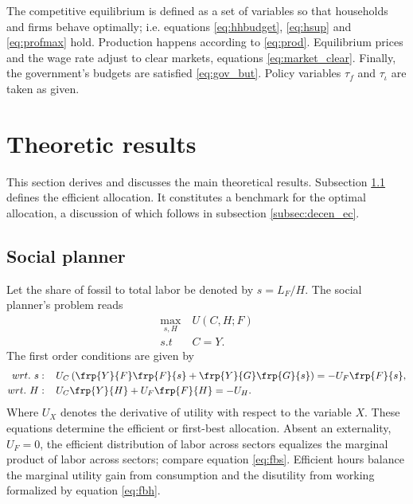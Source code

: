 The competitive equilibrium is defined as a set of variables so that households and firms behave optimally; i.e. equations \ref{eq:hhbudget}, \ref{eq:hsup} and \ref{eq:profmax} hold. Production happens according to \ref{eq:prod}.  Equilibrium prices and the wage rate adjust to clear markets, equations \ref{eq:market_clear}. Finally, the government's budgets are satisfied \ref{eq:gov_but}. Policy variables $\tau_f$ and $\tau_\iota$ are taken as given. 

\section{Theoretic results}\label{sec:theory}
This section derives and discusses the main theoretical results. Subsection \ref{subsec:sp} defines the efficient allocation. It constitutes a benchmark for the optimal allocation, a discussion of which follows in subsection \ref{subsec:decen_ec}. 
\subsection{Social planner}\label{subsec:sp}
Let the share of fossil to total labor be denoted by $s=L_F/H$. The social planner's problem reads
\begin{align}
\underset{s, H}{\max}\ & U(C,H; F)\\ s.t\ \ & C=Y.
\end{align}
The first order conditions are given by
\begin{align}
wrt.\ s:\hspace{4mm} & U_C\left(\frp{Y}{F}\frp{F}{s}+\frp{Y}{G}\frp{G}{s}\right)=-U_F\frp{F}{s}, \label{eq:fbs}
\\
wrt.\ H:\hspace{4mm} & U_C\frp{Y}{H}+U_F\frp{F}{H}=-U_H\label{eq:fbh}. 
\end{align}
Where $U_X$ denotes the derivative of utility with respect to the variable $X$.
These equations determine the efficient or first-best allocation. 
Absent an externality, $U_F=0$, the efficient distribution of labor across sectors equalizes the marginal product of labor across sectors; compare equation \ref{eq:fbs}. Efficient hours balance the marginal utility gain from consumption and the disutility from working formalized by equation \ref{eq:fbh}. 

